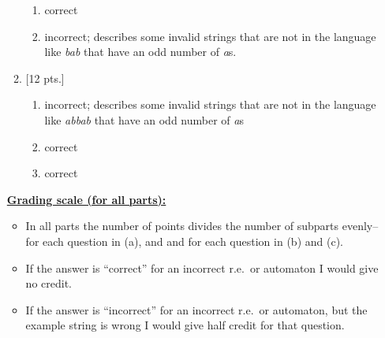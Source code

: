 \documentclass[11pt,fleqn]{article}
\begin{document}
\begin{enumerate}
\begin{enumerate}
\begin{enumerate}
                    \item correct

                    \item incorrect; describes some invalid strings that are
                          not in the language like \emph{bab} that have an
                          odd number of \emph{a}s.

                  \end{enumerate}

            \item {{[12 pts.]}}

                  \begin{enumerate}

                    \addtolength{\itemsep}{2mm}

                    \item incorrect; describes some invalid strings that are
                          not in the language like \emph{abbab} that have an
                          odd number of \emph{a}s

                    \item correct

                    \item correct

                  \end{enumerate}

          \end{enumerate}

          \vspace{-2.5mm}

          \begin{info}{\textbf{\underline{Grading scale (for all parts):}}}

            \begin{itemize}

              \addtolength{\itemsep}{1mm}

              \item In all parts the number of points divides the number of
                    subparts evenly--  for each question in (a), and
                    and  for each question in (b) and (c).

              \item If the answer is ``correct'' for an incorrect r.e.\ or
                    automaton I would give no credit.

              \item If the answer is ``incorrect'' for an incorrect r.e.\ or
                    automaton, but the example string is wrong I would give
                    half credit for that question.


\end{itemize}
\end{info}
\end{enumerate}
\end{document}

